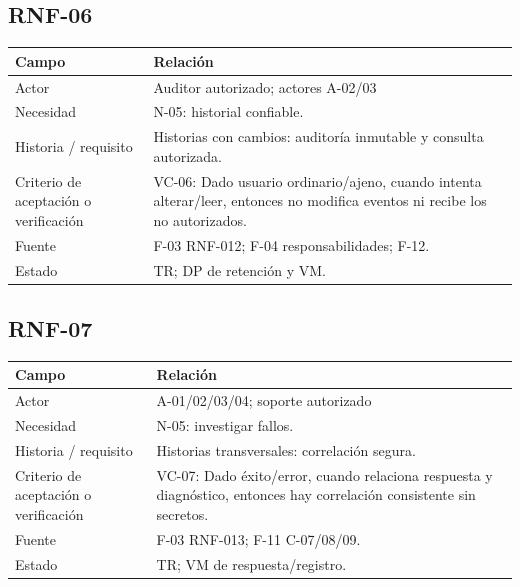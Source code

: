 \documentclass[12pt,a4paper]{report}
\begin{document}
\subsection{RNF-06}\label{matriz-RNF-06}

{\def\LTcaptype{none} %
\begin{longtable}[]{@{}
  >{\raggedright\arraybackslash}p{}
  >{\raggedright\arraybackslash}p{}@{}}
\toprule\noalign{}
\begin{minipage}[b]{\linewidth}\raggedright
Campo
\end{minipage} & \begin{minipage}[b]{\linewidth}\raggedright
Relación
\end{minipage} \\
\midrule\noalign{}
\endhead
\bottomrule\noalign{}
\endlastfoot
Actor & Auditor autorizado; actores A-02/03 \\
Necesidad & N-05: historial confiable. \\
Historia / requisito & Historias con cambios: auditoría inmutable y
consulta autorizada. \\
Criterio de aceptación o verificación & VC-06: Dado usuario
ordinario/ajeno, cuando intenta alterar/leer, entonces no modifica
eventos ni recibe los no autorizados. \\
Fuente & F-03 RNF-012; F-04 responsabilidades; F-12. \\
Estado & TR; DP de retención y VM. \\
\end{longtable}
}

\subsection{RNF-07}\label{matriz-RNF-07}

{\def\LTcaptype{none} %
\begin{longtable}[]{@{}
  >{\raggedright\arraybackslash}p{}
  >{\raggedright\arraybackslash}p{}@{}}
\toprule\noalign{}
\begin{minipage}[b]{\linewidth}\raggedright
Campo
\end{minipage} & \begin{minipage}[b]{\linewidth}\raggedright
Relación
\end{minipage} \\
\midrule\noalign{}
\endhead
\bottomrule\noalign{}
\endlastfoot
Actor & A-01/02/03/04; soporte autorizado \\
Necesidad & N-05: investigar fallos. \\
Historia / requisito & Historias transversales: correlación segura. \\
Criterio de aceptación o verificación & VC-07: Dado éxito/error,
cuando relaciona respuesta y diagnóstico, entonces hay correlación
consistente sin secretos. \\
Fuente & F-03 RNF-013; F-11 C-07/08/09. \\
Estado & TR; VM de respuesta/registro. \\
\end{longtable}
}
\end{document}
